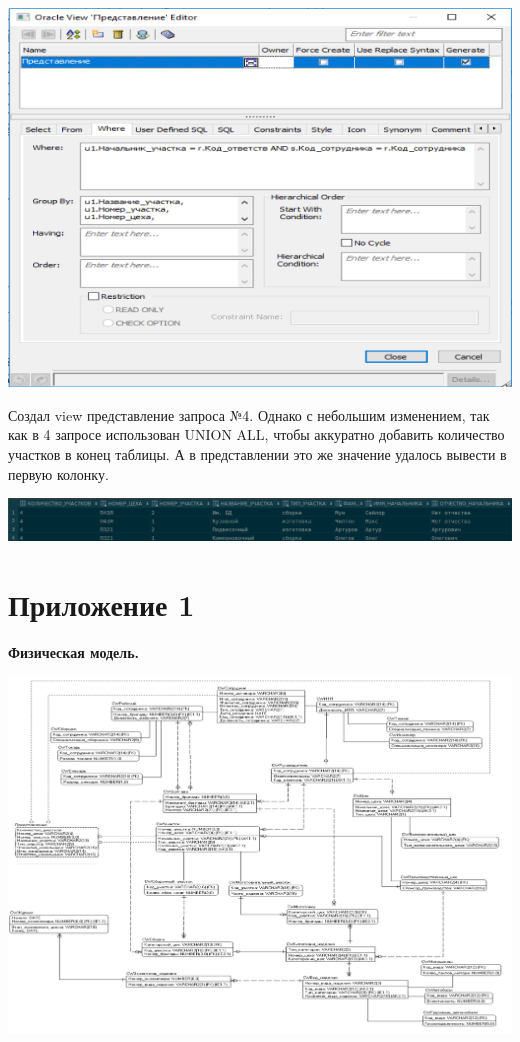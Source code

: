 \includegraphics[width=16cm]{./screenshots/view/where_page.png}

Создал view представление запроса №4.
Однако с небольшим изменением, так как в 4 запросе использован UNION ALL, чтобы аккуратно добавить количество участков в конец таблицы.
А в представлении это же значение удалось вывести в первую колонку.

\includegraphics[width=16cm]{./screenshots/view/result.png}

\newpage

\section{Приложение 1}

    {\bf Физическая модель.}

    \includegraphics[width=16cm]{./screenshots/model/physical.png}

